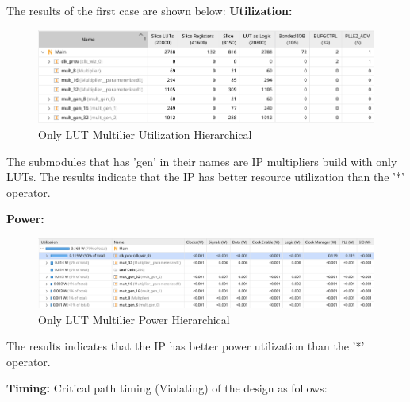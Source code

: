 \documentclass{report}
\begin{document}
The results of the first case are shown below:    
\textbf{Utilization:}
\begin{figure}[ht]
    \includegraphics[width=1\linewidth]{images/LUT_MUL_Util.png}
    \centering
    \caption{Only LUT Multilier Utilization Hierarchical}
    \label{fig:only_lut_util}
\end{figure}

The submodules that has 'gen' in their names are IP multipliers build with only LUTs. The results indicate that the IP has better resource utilization than the '*' operator.

\textbf{Power:}
\begin{figure}[ht]
    \includegraphics[width=1\linewidth]{images/LUT_MUL_POWER.png}
    \centering
    \caption{Only LUT Multilier Power Hierarchical}
    \label{fig:only_lut_power}
\end{figure}

The results indicates that the IP has better power utilization than the '*' operator.

\textbf{Timing:}
Critical path timing (Violating) of the design as follows:
\end{document}

